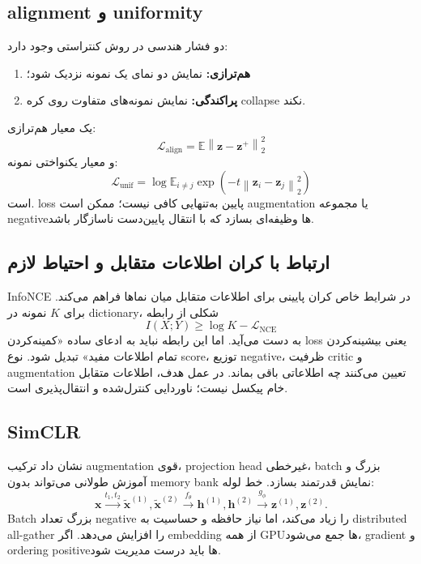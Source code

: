 \documentclass[12pt,openany,oneside]{book}
\newcommand{\E}{\mathbb{E}}
\newcommand{\norm}[1]{\left\lVert #1\right\rVert}
\newcommand{\vect}[1]{\bm{#1}}
\begin{document}
\subsection{alignment و uniformity}
دو فشار هندسی در روش کنتراستی وجود دارد:
\begin{enumerate}
\item \textbf{هم‌ترازی:} نمایش دو نمای یک نمونه نزدیک شود؛
\item \textbf{پراکندگی:} نمایش نمونه‌های متفاوت روی کره collapse نکند.
\end{enumerate}
یک معیار هم‌ترازی:
\begin{equation}
\mathcal L_{\mathrm{align}}=\E\norm{\vect z-\vect z^+}_2^2
\end{equation}
و معیار یکنواختی نمونه:
\begin{equation}
\mathcal L_{\mathrm{unif}}
=\log\E_{i\neq j}\exp(-t\norm{\vect z_i-\vect z_j}_2^2)
\end{equation}
است. loss پایین به‌تنهایی کافی نیست؛ ممکن است augmentation یا مجموعه negativeها وظیفه‌ای بسازد که با انتقال پایین‌دست ناسازگار باشد.

\subsection{ارتباط با کران اطلاعات متقابل و احتیاط لازم}
InfoNCE در شرایط خاص کران پایینی برای اطلاعات متقابل میان نماها فراهم می‌کند. برای $K$ نمونه در dictionary، شکلی از رابطه
\begin{equation}
I(X;Y)\geq \log K-\mathcal L_{\mathrm{NCE}}
\end{equation}
به دست می‌آید. اما این رابطه نباید به ادعای ساده «کمینه‌کردن loss یعنی بیشینه‌کردن تمام اطلاعات مفید» تبدیل شود. نوع score، توزیع negative، ظرفیت critic و augmentation تعیین می‌کنند چه اطلاعاتی باقی بماند. در عمل هدف، اطلاعات متقابل خام پیکسل نیست؛ ناوردایی کنترل‌شده و انتقال‌پذیری است.

\subsection{SimCLR}
 نشان داد ترکیب augmentation قوی، projection head غیرخطی، batch بزرگ و آموزش طولانی می‌تواند بدون memory bank نمایش قدرتمند بسازد. خط لوله:
\begin{equation}
\vect x\xrightarrow{t_1,t_2}
\widetilde{\vect x}^{(1)},\widetilde{\vect x}^{(2)}
\xrightarrow{f_\theta}
\vect h^{(1)},\vect h^{(2)}
\xrightarrow{g_\phi}
\vect z^{(1)},\vect z^{(2)}.
\end{equation}
Batch بزرگ تعداد negative را زیاد می‌کند، اما نیاز حافظه و حساسیت به distributed all-gather را افزایش می‌دهد. اگر embedding از همه GPUها جمع می‌شود، gradient و ordering positiveها باید درست مدیریت شود.
\end{document}
